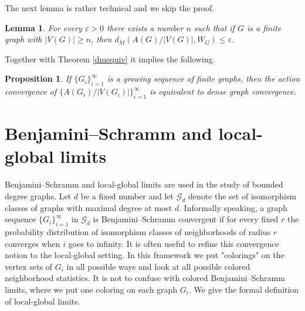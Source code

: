 \documentclass[a4wider]{amsart}
\newtheorem{lemma}[theorem]{Lemma}
\newtheorem{proposition}[theorem]{Proposition}
\theoremstyle{definitionbreak}\newtheorem{D}[theorem]{Definition}
\theoremstyle{definitionbreak}\newtheorem*{D*}{Definition}
\begin{document}
The next lemma is rather technical and we skip the proof.

\begin{lemma} For every $\varepsilon>0$ there exists a number $n$ such that if $G$ is a finite graph with $|V(G)|\geq n$, then $d_M(A(G)/|V(G)|, W_G)\leq\varepsilon$.
\end{lemma}

Together with Theorem \ref{dmequiv} it implies the following.

\begin{proposition} If $\{G_i\}_{i=1}^\infty$ is a growing sequence of finite graphs, then the action convergence of $\{A(G_i)/|V(G_i)|\}_{i=1}^\infty$ is equivalent to dense graph convergence. 
\end{proposition}








\section{Benjamini--Schramm and local-global limits}

Benjamini--Schramm and local-global limits are used in the study of bounded degree graphs. Let $d$ be a fixed number and let $\mathcal{G}_d$ denote the set of isomorphism classes of graphs with maximal degree at most $d$. Informally speaking, a graph sequence $\{G_i\}_{i=1}^\infty$ in $\mathcal{G}_d$ is Benjamini--Schramm convergent if for every fixed $r$ the probability distribution of isomorphism classes of neighborhoods of radius $r$ converges when $i$ goes to infinity. It is often useful to refine this convergence notion to the local-global setting. In this framework we put "colorings" on the vertex sets of $G_i$ in all possible ways and look at all possible colored neighborhood statistics. It is not to confuse with colored Benjamini--Schramm limits, where we put one coloring on each graph $G_i$. We give the formal definition of local-global limits.
\end{document}
